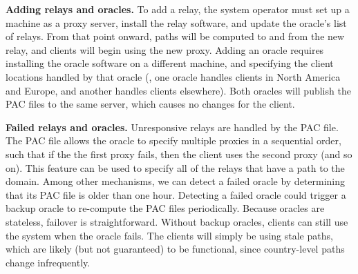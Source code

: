 {\bf Adding relays and oracles.} To add a relay, the system
operator must set up a machine as a proxy server, install the relay
software, and update the oracle's list of relays.  From that point
onward, paths will be computed to and from the new relay, and clients
will begin using the new proxy.  Adding an oracle requires installing
the oracle software on a different machine, and specifying the client
locations handled by that oracle (\eg, one oracle handles clients in
North America and Europe, and another handles clients elsewhere).
Both oracles will publish the PAC files to the same server, which
causes no changes for the client.

{\bf Failed relays and oracles.} Unresponsive relays are handled
by the PAC file.  The PAC file allows the oracle to specify multiple
proxies in a sequential order, such that if the the first proxy fails,
then the client uses the second proxy (and so on).  This feature can
be used to specify all of the relays that have a path to the domain.
Among other mechanisms, we can detect a failed oracle by determining
that its PAC file is older than one hour.  Detecting a failed oracle
could trigger a backup oracle to re-compute the PAC files
periodically.  Because oracles are stateless, failover is
straightforward.  Without backup oracles, clients can still use the
system when the oracle fails.  The clients will simply be using stale
paths, which are likely (but not guaranteed) to be functional, since
country-level paths change infrequently.

